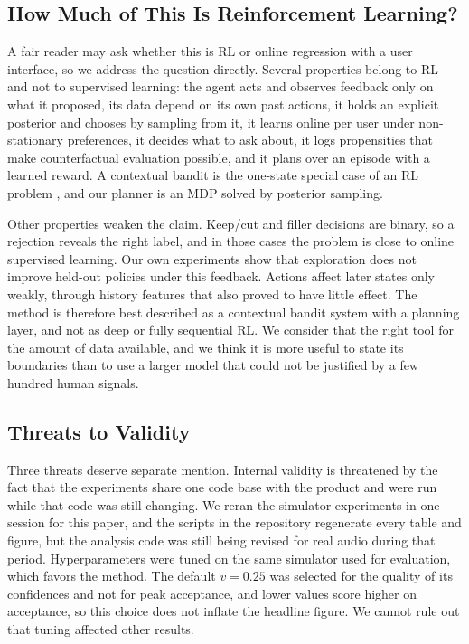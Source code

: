 \documentclass{ieeeaccess}
\begin{document}
\subsection{How Much of This Is Reinforcement Learning?}
A fair reader may ask whether this is RL or online regression with a user interface, so we address the question directly. Several properties belong to RL and not to supervised learning: the agent acts and observes feedback only on what it proposed, its data depend on its own past actions, it holds an explicit posterior and chooses by sampling from it, it learns online per user under non-stationary preferences, it decides what to ask about, it logs propensities that make counterfactual evaluation possible, and it plans over an episode with a learned reward. A contextual bandit is the one-state special case of an RL problem \cite{sutton2018,lattimore2020}, and our planner is an MDP solved by posterior sampling.

Other properties weaken the claim. Keep/cut and filler decisions are binary, so a rejection reveals the right label, and in those cases the problem is close to online supervised learning. Our own experiments show that exploration does not improve held-out policies under this feedback. Actions affect later states only weakly, through history features that also proved to have little effect. The method is therefore best described as a contextual bandit system with a planning layer, and not as deep or fully sequential RL. We consider that the right tool for the amount of data available, and we think it is more useful to state its boundaries than to use a larger model that could not be justified by a few hundred human signals.

\subsection{Threats to Validity}
Three threats deserve separate mention. Internal validity is threatened by the fact that the experiments share one code base with the product and were run while that code was still changing. We reran the simulator experiments in one session for this paper, and the scripts in the repository regenerate every table and figure, but the analysis code was still being revised for real audio during that period. Hyperparameters were tuned on the same simulator used for evaluation, which favors the method. The default $v=0.25$ was selected for the quality of its confidences and not for peak acceptance, and lower values score higher on acceptance, so this choice does not inflate the headline figure. We cannot rule out that tuning affected other results.
\end{document}

